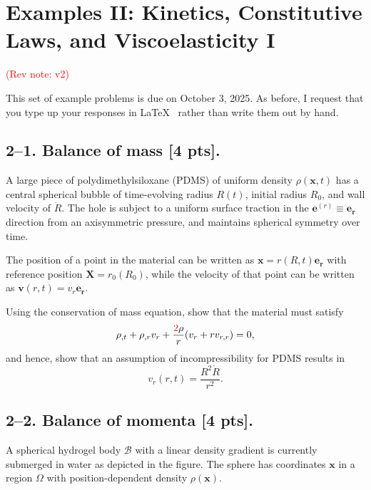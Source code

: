 \setcounter{section}{1} %


\section*{Examples II: Kinetics, Constitutive Laws, and Viscoelasticity I}
\label{PS2}
\textcolor{red}{(Rev note: v2)}


This set of example problems is due on October 3, 2025. 
As before, I request that you type up your responses in \LaTeX~ rather than write them out by hand. 

\medskip
\subsection*{2--1. \textbf{Balance of mass} [4 pts].} 
A large piece of polydimethylsiloxane (PDMS) of uniform density $\rho(\bm{x},t)$ has a central spherical bubble of time-evolving radius $R(t)$, initial radius $R_0$, and wall velocity of $\dot{R}$. 
The hole is subject to a uniform surface traction in the $\bm{e}^{(r)} \equiv \bm{e}_{\bm{r}}$ direction from an axisymmetric pressure, and maintains spherical symmetry over time. 

\medskip
The position of a point in the material can be written as $\bm{x} = r(R,t) \bm{e}_{\bm{r}}$ with reference position $\bm{X} = r_0(R_0)$, while the velocity of that point can be written as $\bm{v}(r,t) = v_r \bm{e}_{\bm{r}}$.

\medskip
Using the conservation of mass equation, show that the material must satisfy
\begin{equation*}
\rho_{,t}+ \rho_{,r} v_r + \frac{\textcolor{red}{2}\rho}{r} (v_r + r v_{r,r}) = 0,
\end{equation*}
and hence, show that an assumption of incompressibility for PDMS results in 
\begin{equation*}
v_r(r,t) = \frac{R^2 \dot{R}}{r^2}.
\end{equation*}

\medskip
\subsection*{2--2. \textbf{Balance of momenta} [4 pts].} A spherical hydrogel body $\mathcal{B}$ with a linear density gradient is currently submerged in water as depicted in the figure. 
The sphere has coordinates $\bm{x}$ in a region $\Omega$ with position-dependent density $\rho(\bm{x})$. 

